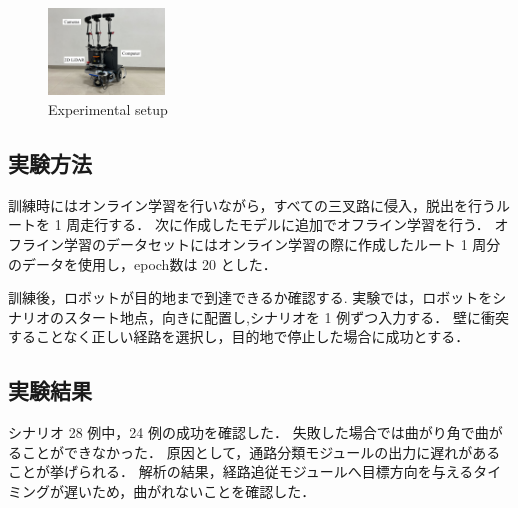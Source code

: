 \documentclass[10pt]{jarticle}
\begin{document}
    \begin{figure}[h]
        \centering
        \includegraphics[width=0.275\textwidth]{./fig/ishiguro/gamma.pdf}
        \vspace{-1zh}
        \caption{Experimental setup}
        \label{fig:gamma}
    \end{figure}
    
    \subsection{実験方法}

    訓練時にはオンライン学習を行いながら，すべての三叉路に侵入，脱出を行うルートを 1 周走行する．
    次に作成したモデルに追加でオフライン学習を行う．
    オフライン学習のデータセットにはオンライン学習の際に作成したルート 1 周分のデータを使用し，epoch数は 20 とした．
   

    訓練後，ロボットが目的地まで到達できるか確認する.
    実験では，ロボットをシナリオのスタート地点，向きに配置し,シナリオを 1 例ずつ入力する．
    壁に衝突することなく正しい経路を選択し，目的地で停止した場合に成功とする．

    \subsection{実験結果}
    シナリオ 28 例中，24 例の成功を確認した．
    失敗した場合では曲がり角で曲がることができなかった．
    原因として，通路分類モジュールの出力に遅れがあることが挙げられる．
    解析の結果，経路追従モジュールへ目標方向を与えるタイミングが遅いため，曲がれないことを確認した．
\end{document}
